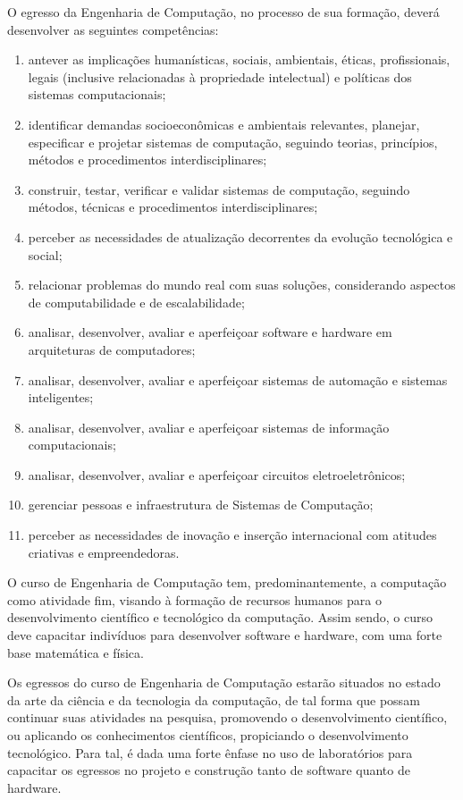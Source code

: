 O egresso da Engenharia de Computação, no processo de sua formação, deverá desenvolver as seguintes competências:
\begin{enumerate} [I -]
\item antever as implicações humanísticas, sociais, ambientais, éticas, profissionais, legais (inclusive relacionadas à propriedade intelectual) e políticas dos sistemas computacionais;
\item identificar demandas socioeconômicas e ambientais relevantes, planejar, especificar e projetar sistemas de computação, seguindo teorias, princípios, métodos e procedimentos interdisciplinares;
\item construir, testar, verificar e validar sistemas de computação, seguindo métodos, técnicas e procedimentos interdisciplinares;
\item perceber as necessidades de atualização decorrentes da evolução tecnológica e social;
\item relacionar problemas do mundo real com suas soluções, considerando aspectos de computabilidade e de escalabilidade;
\item analisar, desenvolver, avaliar e aperfeiçoar software e hardware em arquiteturas de computadores;
\item analisar, desenvolver, avaliar e aperfeiçoar sistemas de automação e sistemas inteligentes;
\item analisar, desenvolver, avaliar e aperfeiçoar sistemas de informação computacionais;
\item analisar, desenvolver, avaliar e aperfeiçoar circuitos eletroeletrônicos;
\item gerenciar pessoas e infraestrutura de Sistemas de Computação;
\item perceber as necessidades de inovação e inserção internacional com atitudes criativas e empreendedoras.
\end{enumerate}

O curso de Engenharia de Computação tem, predominantemente, a computação como atividade fim, visando à formação de recursos humanos para o desenvolvimento científico e tecnológico da computação. Assim sendo, o curso deve capacitar indivíduos para desenvolver software e hardware, com uma forte base matemática e física.

Os egressos do curso de Engenharia de Computação estarão situados no estado da arte da ciência e da tecnologia da computação, de tal forma que possam continuar suas atividades na pesquisa, promovendo o desenvolvimento científico, ou aplicando os conhecimentos científicos, propiciando o desenvolvimento tecnológico. Para tal, é dada uma forte ênfase no uso de laboratórios para capacitar os egressos no projeto e construção tanto de software quanto de hardware.
